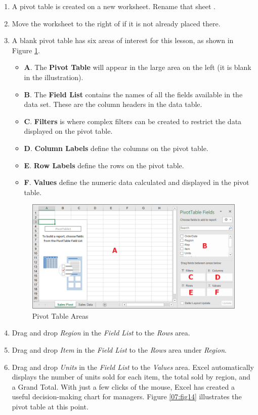 \begin{enumbox}
\begin{enumerate}
		\item A pivot table is created on a new worksheet. Rename that sheet .
		\item Move the  worksheet to the right of  if it is not already placed there.
		\item A blank pivot table has six areas of interest for this lesson, as shown in Figure \ref{07:fig13}.
	
		\begin{itemize}
			\item \textbf{A}. The \textbf{Pivot Table} will appear in the large area on the left (it is blank in the illustration).
			\item \textbf{B}. The \textbf{Field List} contains the names of all the fields available in the data set. These are the column headers in the data table.
			\item \textbf{C}. \textbf{Filters} is where complex filters can be created to restrict the data displayed on the pivot table.
			\item \textbf{D}. \textbf{Column Labels} define the columns on the pivot table.
			\item \textbf{E}. \textbf{Row Labels} define the rows on the pivot table.
			\item \textbf{F}. \textbf{Values} define the numeric data calculated and displayed in the pivot table.
		\end{itemize}

		\begin{figure}[H]
			\centering
			\includegraphics[width=\maxwidth{.95\linewidth}]{gfx/ch07_fig13}
			\caption{Pivot Table Areas}
			\label{07:fig13}
		\end{figure}

		\item Drag and drop \textit{Region} in the \textit{Field List} to the \textit{Rows} area. 
		\item Drag and drop \textit{Item} in the \textit{Field List} to the \textit{Rows} area under \textit{Region}.
		\item Drag and drop \textit{Units} in the \textit{Field List} to the \textit{Values} area. Excel automatically displays the number of units sold for each item,  the total sold by region, and a Grand Total. With just a few clicks of the mouse, Excel has created a useful decision-making chart for managers. Figure \ref{07:fig14} illustrates the pivot table at this point.


\end{enumerate}
\end{enumbox}
